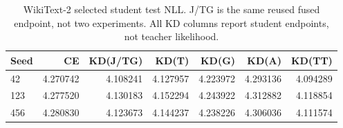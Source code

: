 \begin{table}[!t]\centering
\begin{tabular}{lrrrrrr}
\toprule
Seed & CE & KD(J/TG) & KD(T) & KD(G) & KD(A) & KD(TT) \\
\midrule
42 & 4.270742 & 4.108241 & 4.127957 & 4.223972 & 4.293136 & 4.094289 \\
123 & 4.277520 & 4.130183 & 4.152294 & 4.243922 & 4.312882 & 4.118854 \\
456 & 4.280830 & 4.123673 & 4.144237 & 4.238226 & 4.306036 & 4.111574 \\
\bottomrule
\end{tabular}
\caption{WikiText-2 selected student test NLL. J/TG is the same reused fused endpoint, not two experiments. All KD columns report student endpoints, not teacher likelihood.}\label{tab:wt2_endpoints}
\end{table}
